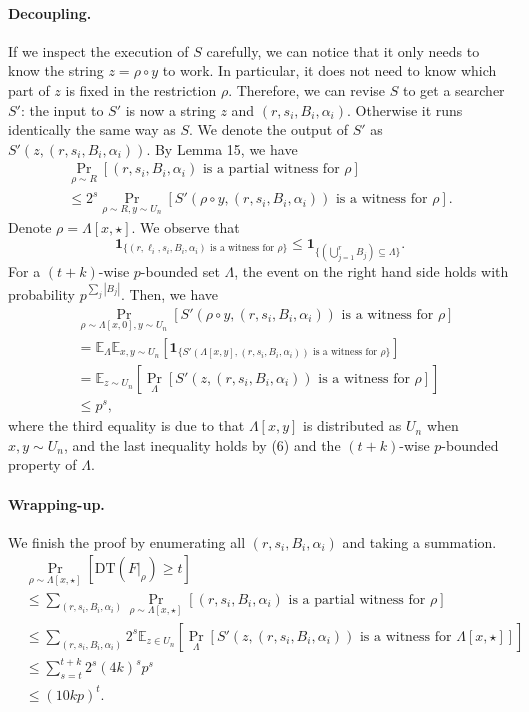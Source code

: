 \documentclass[10pt,a4paper]{article}
\begin{document}
\paragraph{Decoupling.} If we inspect the execution of $S$ carefully, we can notice that it only needs to know the string $z=\rho\circ y$ to work. In particular, it does not need to know which part of $z$ is fixed in the restriction $\rho$. Therefore, we can revise $S$ to get a searcher $S'$: the input to $S'$ is now a string $z$ and $(r,s_i,B_i,\alpha_i)$. Otherwise it runs identically the same way as $S$. We denote the output of $S'$ as $S'(z,(r,s_i,B_i,\alpha_i))$. By Lemma 15, we have
\begin{multline*}\Pr_{\rho\sim R}[(r,s_i,B_i,\alpha_i)\text{ is a partial witness for }\rho]\\\le2^s\Pr_{\rho\sim R,y\sim U_n}[S'(\rho\circ y,(r,s_i,B_i,\alpha_i))\text{ is a witness for }\rho].\end{multline*}
Denote $\rho=\Lambda[x,\star]$. We observe that
\[\mathbf1_{\{(r,\ell_i,s_i,B_i,\alpha_i)\text{ is a witness for }\rho\}}\le\mathbf1_{\{(\bigcup_{j=1}^rB_j)\subseteq\Lambda\}}.\tag{6}\]
For a $(t+k)$-wise $p$-bounded set $\Lambda$, the event on the right hand side holds with probability $p^{\sum_j|B_j|}$. Then, we have
\begin{align*}&\Pr_{\rho\sim\Lambda[x,0],y\sim U_n}[S'(\rho\circ y,(r,s_i,B_i,\alpha_i))\text{ is a witness for }\rho]\\&=\mathbb E_\Lambda\mathbb E_{x,y\sim U_n}[\mathbf1_{\{S'(\Lambda[x,y],(r,s_i,B_i,\alpha_i))\text{ is a witness for }\rho\}}]\\&=\mathbb E_{z\sim U_n}\left[\Pr_\Lambda[S'(z,(r,s_i,B_i,\alpha_i))\text{ is a witness for }\rho]\right]\\&\le p^s,\end{align*}
where the third equality is due to that $\Lambda[x,y]$ is distributed as $U_n$ when $x,y\sim U_n$, and the last inequality holds by (6) and the $(t+k)$-wise $p$-bounded property of $\Lambda$.
\paragraph{Wrapping-up.} We finish the proof by enumerating all $(r,s_i,B_i,\alpha_i)$ and taking a summation.
\begin{align*}&\Pr_{\rho\sim\Lambda[x,\star]}[\mathrm{DT}(F|_\rho)\ge t]\\&\le\sum_{(r,s_i,B_i,\alpha_i)}\Pr_{\rho\sim\Lambda[x,\star]}[(r,s_i,B_i,\alpha_i)\text{ is a partial witness for }\rho]\\&\le\sum_{(r,s_i,B_i,\alpha_i)}2^s\mathbb E_{z\in U_n}\left[\Pr_\Lambda[S'(z,(r,s_i,B_i,\alpha_i))\text{ is a witness for }\Lambda[x,\star]]\right]\\&\le\sum_{s=t}^{t+k}2^s(4k)^sp^s\\&\le(10kp)^t.\tag{7}\end{align*}
\end{document}
